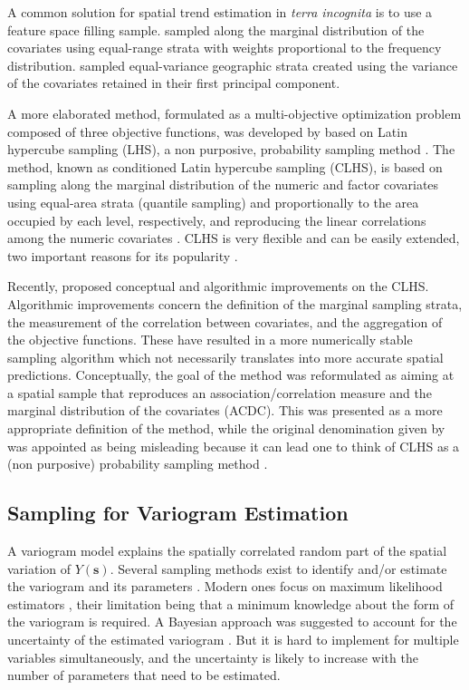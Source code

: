 A common solution for spatial trend estimation in \emph{terra incognita} is to use a feature space filling 
sample. \citet{HenglEtAl2003a} sampled along the marginal distribution of the covariates using equal-range 
strata with weights proportional to the frequency distribution. \citet{MinasnyEtAl2007a} sampled equal-variance 
geographic strata created using the variance of the covariates retained in their first principal component.

A more elaborated method, formulated as a multi-objective optimization problem composed of three objective 
functions, was developed by \citet{MinasnyEtAl2006b} based on Latin hypercube sampling (LHS), a non purposive, 
probability sampling method \cite{McKayEtAl1979}. The method, known as conditioned Latin hypercube sampling 
(CLHS), is based on sampling along the marginal distribution of the numeric and factor covariates using 
equal-area strata (quantile sampling) and proportionally to the area occupied by each level, respectively, and 
reproducing the linear correlations among the numeric covariates \cite{MinasnyEtAl2006b}. CLHS is very flexible 
and can be easily extended, two important reasons for its popularity \cite{MinasnyEtAl2010a, RoudierEtAl2012}.

Recently, \citet{Samuel-RosaEtAl2016} proposed conceptual and algorithmic improvements on the CLHS. Algorithmic 
improvements concern the definition of the marginal sampling strata, the measurement of the correlation between 
covariates, and the aggregation of the objective functions. These have resulted in a more numerically stable 
sampling algorithm which not necessarily translates into more accurate spatial predictions. Conceptually, the 
goal of the method was reformulated as aiming at a spatial sample that reproduces an association/correlation 
measure and the marginal distribution of the covariates (ACDC). This was presented as a more appropriate 
definition of the method, while the original denomination given by \citet{MinasnyEtAl2006b} was appointed as 
being misleading because it can lead one to think of CLHS as a (non purposive) probability sampling method 
\citet{Samuel-RosaEtAl2016}.

\subsection{Sampling for Variogram Estimation}

A variogram model explains the spatially correlated random part of the spatial variation of 
$Y(\boldsymbol{s})$. Several sampling methods exist to identify and/or estimate the variogram and its 
parameters \cite{BrusEtAl1994, deGruijterEtAl2006, Mueller2007, WebsterEtAl2013}. Modern ones focus on maximum 
likelihood estimators \cite{Lark2002, Zimmerman2006, Mueller2007}, their limitation being that a minimum 
knowledge about the form of the variogram is required. A Bayesian approach was suggested to account for the 
uncertainty of the estimated variogram \cite{DiggleEtAl2006, MarchantEtAl2006, ZhuEtAl2006}. But it is hard to 
implement for multiple variables simultaneously, and the uncertainty is likely to increase with the number of 
parameters that need to be estimated.

